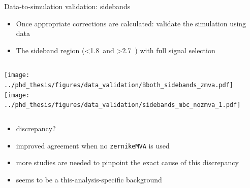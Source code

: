 \documentclass[xcolor=dvipsnames]{beamer}
\begin{document}
\begin{frame}{Data-to-simulation validation: sidebands}
   \scriptsize\centering
   \begin{itemize}
      \item Once appropriate corrections are calculated: validate the simulation using data
      \item The sideband region (\EB<1.8~\gev and \EB>2.7~\gev) with full signal selection
   \end{itemize}

   \begin{columns}
      \texttt{[image: ../phd\_thesis/figures/data\_validation/Bboth\_sidebands\_zmva.pdf]}
      \texttt{[image: ../phd\_thesis/figures/data\_validation/sidebands\_mbc\_nozmva\_1.pdf]}
   \end{columns}

   \begin{itemize}
      \item {} discrepancy?
      \item[\ra] improved agreement when no \texttt{zernikeMVA} is used
      \item[\ra] more studies are needed to pinpoint the exact cause of this discrepancy
      \item[\ra] seems to be a this-analysis-specific background
   \end{itemize}

\end{frame}
\end{document}
